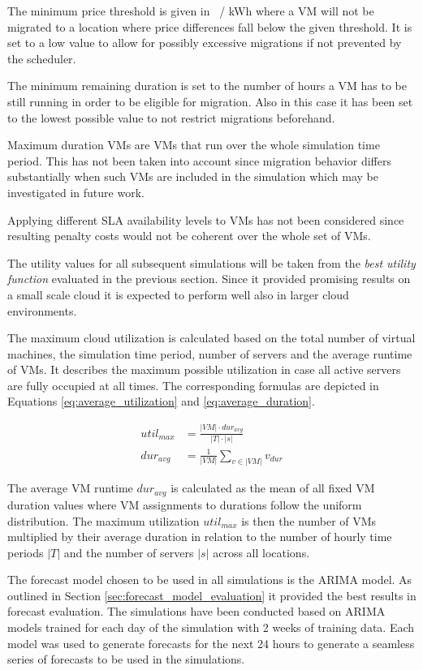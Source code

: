The minimum price threshold is given in \cent \ / kWh where a VM will not be migrated to a location where price differences fall below the given threshold. It is set to a low value to allow for possibly excessive migrations if not prevented by the scheduler. 

The minimum remaining duration is set to the number of hours a VM has to be still running in order to be eligible for migration. Also in this case it has been set to the lowest possible value to not restrict migrations beforehand. 

Maximum duration VMs are VMs that run over the whole simulation time period. This has not been taken into account since migration behavior differs substantially when such VMs are included in the simulation which may be investigated in future work. 

Applying different SLA availability levels to VMs has not been considered since resulting penalty costs would not be coherent over the whole set of VMs. 

The utility values for all subsequent simulations will be taken from the \textit{best utility function} evaluated in the previous section. Since it provided promising results on a small scale cloud it is expected to perform well also in larger cloud environments. 

The maximum cloud utilization is calculated based on the total number of virtual machines, the simulation time period, number of servers and the average runtime of VMs. It describes the maximum possible utilization in case all active servers are fully occupied at all times. The corresponding formulas are depicted in Equations \ref{eq:average_utilization} and \ref{eq:average_duration}.

\begin{align}
	util_{max} &=  \frac{|VM| \cdot dur_{avg}}{|T| \cdot |s|} \label{eq:average_utilization} \\
	dur_{avg} &= \frac{1}{|VM|} \sum_{v \in |VM|} v_{dur} \label{eq:average_duration}
\end{align}

The average VM runtime $dur_{avg}$ is calculated as the mean of all fixed VM duration values where VM assignments to durations follow the uniform distribution. The maximum utilization $util_{max}$ is then the number of VMs multiplied by their average duration in relation to the number of hourly time periods $|T|$ and the number of servers $|s|$ across all locations. 

The forecast model chosen to be used in all simulations is the ARIMA model. As outlined in Section \ref{sec:forecast_model_evaluation} it provided the best results in forecast evaluation. The simulations have been conducted based on ARIMA models trained for each day of the simulation with 2 weeks of training data. Each model was used to generate forecasts for the next 24 hours to generate a seamless series of forecasts to be used in the simulations. 

